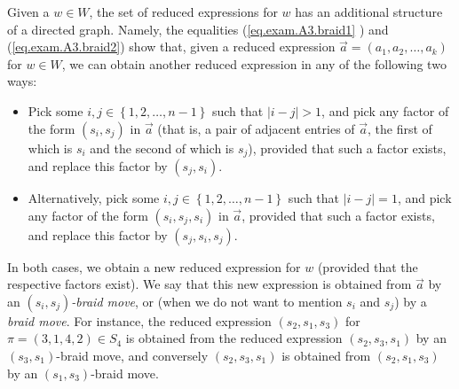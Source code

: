 \documentclass[numbers=enddot,12pt,final,onecolumn,notitlepage,abstracton]{scrartcl}%
\theoremstyle{definition}
\begin{document}
Given a $w\in W$, the set of reduced expressions for $w$ has an additional
structure of a directed graph. Namely, the equalities (\ref{eq.exam.A3.braid1}%
) and (\ref{eq.exam.A3.braid2}) show that, given a reduced expression
$\overrightarrow{a}=\left(  a_{1},a_{2},\ldots,a_{k}\right)  $ for $w\in W$,
we can obtain another reduced expression in any of the following two ways:

\begin{itemize}
\item Pick some $i,j\in\left\{  1,2,\ldots,n-1\right\}  $ such that
$\left\vert i-j\right\vert >1$, and pick any factor of the form $\left(
s_{i},s_{j}\right)  $ in $\overrightarrow{a}$ (that is, a pair of adjacent
entries of $\overrightarrow{a}$, the first of which is $s_{i}$ and the second
of which is $s_{j}$), provided that such a factor exists, and replace this
factor by $\left(  s_{j},s_{i}\right)  $.

\item Alternatively, pick some $i,j\in\left\{  1,2,\ldots,n-1\right\}  $ such
that $\left\vert i-j\right\vert =1$, and pick any factor of the form $\left(
s_{i},s_{j},s_{i}\right)  $ in $\overrightarrow{a}$, provided that such a
factor exists, and replace this factor by $\left(  s_{j},s_{i},s_{j}\right)  $.
\end{itemize}

In both cases, we obtain a new reduced expression for $w$ (provided that the
respective factors exist). We say that this new expression is obtained from
$\overrightarrow{a}$ by an $\left(  s_{i},s_{j}\right)  $\emph{-braid move},
or (when we do not want to mention $s_{i}$ and $s_{j}$) by a \emph{braid
move}. For instance, the reduced expression $\left(  s_{2},s_{1},s_{3}\right)
$ for $\pi=\left(  3,1,4,2\right)  \in S_{4}$ is obtained from the reduced
expression $\left(  s_{2},s_{3},s_{1}\right)  $ by an $\left(  s_{3}%
,s_{1}\right)  $-braid move, and conversely $\left(  s_{2},s_{3},s_{1}\right)
$ is obtained from $\left(  s_{2},s_{1},s_{3}\right)  $ by an $\left(
s_{1},s_{3}\right)  $-braid move.
\end{document}
